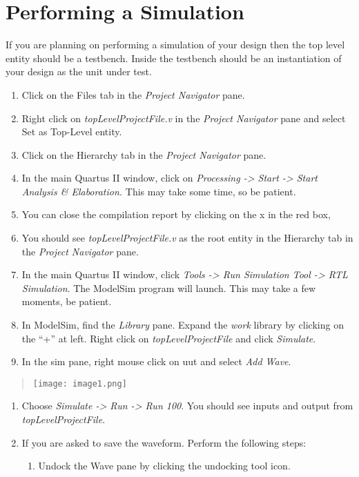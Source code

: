 \chapter{Performing a Simulation}
\graphicspath{ {./Lab00HowTo/howTo20 Performing Simulation/Fig} }

If you are planning on performing a simulation of your design then the
top level entity should be a testbench. Inside the testbench should be
an instantiation of your design as the unit under test.

\begin{enumerate}
\def\labelenumi{\arabic{enumi}.}
\item
  Click on the Files tab in the \emph{Project Navigator} pane.
\item
  Right click on \emph{topLevelProjectFile.v} in the \emph{Project
  Navigator} pane and select Set as Top-Level entity.
\item
  Click on the Hierarchy tab in the \emph{Project Navigator} pane.
\item
  In the main Quartus II window, click on \emph{Processing
  -\textgreater{} Start -\textgreater{} Start Analysis \& Elaboration.}
  This may take some time, so be patient.
\item
  You can close the compilation report by clicking on the x in the red
  box,
\item
  You should see \emph{topLevelProjectFile.v} as the root entity in the
  Hierarchy tab in the \emph{Project Navigator} pane.
\item
  In the main Quartus II window, click \emph{Tools -\textgreater{} Run
  Simulation Tool -\textgreater{} RTL Simulation}. The ModelSim program
  will launch. This may take a few moments, be patient.
\item
  In ModelSim, find the \emph{Library} pane. Expand the \emph{work}
  library by clicking on the ``+'' at left. Right click on
  \emph{topLevelProjectFile} and click \emph{Simulate}.
\item
  In the sim pane, right mouse click on uut and select \emph{Add Wave}.
\end{enumerate}

\begin{quote}
\texttt{[image: image1.png]}
\end{quote}

\begin{enumerate}
\def\labelenumi{\arabic{enumi}.}
\setcounter{enumi}{9}
\item
  Choose \emph{Simulate -\textgreater{} Run -\textgreater{} Run 100}.
  You should see inputs and output from \emph{topLevelProjectFile}.
\item
  If you are asked to save the waveform. Perform the following steps:

  \begin{enumerate}
  \def\labelenumii{\alph{enumii}.}
  \item
    Undock the Wave pane by clicking the undocking tool icon.
  \end{enumerate}
\end{enumerate}

